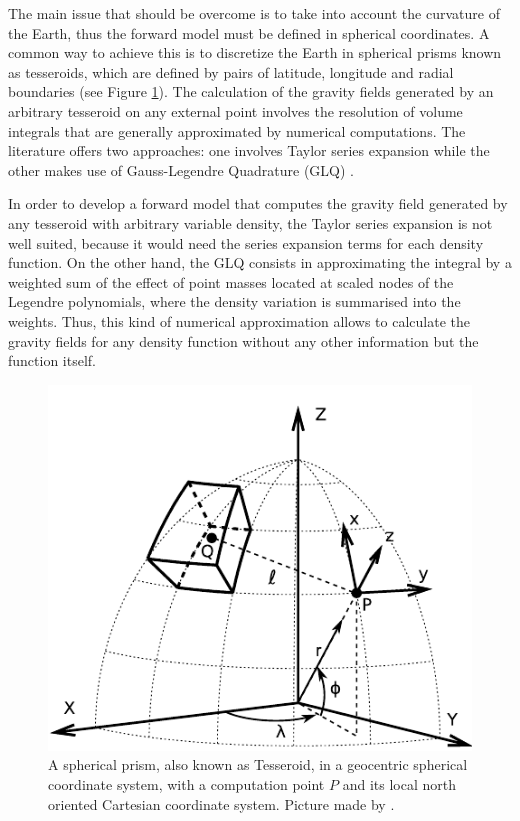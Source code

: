 \documentclass[extra]{gji}
\begin{document}
The main issue that should be overcome is to take into account the curvature of the Earth, thus the forward model must be defined in spherical coordinates.
A common way to achieve this is to discretize the Earth in spherical prisms known as tesseroids, which are defined by pairs of latitude, longitude and radial boundaries (see Figure \ref{fig:tesseroid-uieda}).
The calculation of the gravity fields generated by an arbitrary tesseroid on any external point involves the resolution of volume integrals that are generally approximated by numerical computations.
The literature offers two approaches: one involves Taylor series expansion \citep{Heck2007, Grombein2013} while the other makes use of Gauss-Legendre Quadrature (GLQ) \citep{Asgharzadeh2007, Uieda2016, Uieda2017}.

In order to develop a forward model that computes the gravity field generated by any tesseroid with arbitrary variable density, the Taylor series expansion is not well suited, because it would need the series expansion terms for each density function.
On the other hand, the GLQ consists in approximating the integral by a weighted sum of the effect of point masses located at scaled nodes of the Legendre polynomials, where the density variation is summarised into the weights.
Thus, this kind of numerical approximation allows to calculate the gravity fields for any density function without any other information but the function itself.

\begin{figure}
\centering
\includegraphics[width=0.9\linewidth]{figures/tesseroid-uieda.pdf}
\caption{
A spherical prism, also known as  Tesseroid, in a geocentric spherical coordinate system, with a computation point $P$ and its local north oriented Cartesian coordinate system. Picture made by \citet{Uieda2015}.
}
\label{fig:tesseroid-uieda}
\end{figure}
\end{document}
